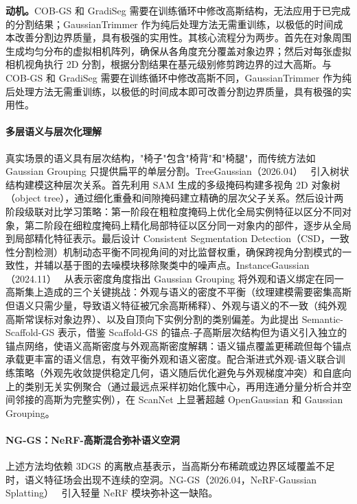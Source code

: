 \textbf{动机。}COB-GS 和 GradiSeg 需要在训练循环中修改高斯结构，无法应用于已完成的分割结果；GaussianTrimmer 作为纯后处理方法无需重训练，以极低的时间成本改善分割边界质量，具有极强的实用性。其核心流程分为两步。首先在对象周围生成均匀分布的虚拟相机阵列，确保从各角度充分覆盖对象边界；然后对每张虚拟相机视角执行 2D 分割，根据分割结果在基元级别修剪跨边界的过大高斯。与 COB-GS 和 GradiSeg 需要在训练循环中修改高斯不同，GaussianTrimmer 作为纯后处理方法无需重训练，以极低的时间成本即可改善分割边界质量，具有极强的实用性。

\paragraph{多层语义与层次化理解} 真实场景的语义具有层次结构，"椅子"包含"椅背"和"椅腿"，而传统方法如 Gaussian Grouping 只提供扁平的单层分割。TreeGaussian（2026.04）~\cite{2604_03309} 引入树状结构建模这种层次关系。首先利用 SAM 生成的多级掩码构建多视角 2D 对象树（object tree），通过细化重叠和间隙掩码建立精确的层次父子关系。然后设计两阶段级联对比学习策略：第一阶段在粗粒度掩码上优化全局实例特征以区分不同对象，第二阶段在细粒度掩码上精化局部特征以区分同一对象内的部件，逐步从全局到局部精化特征表示。最后设计 Consistent Segmentation Detection（CSD，一致性分割检测）机制动态平衡不同视角间的对比监督权重，确保跨视角分割模式的一致性，并辅以基于图的去噪模块移除聚类中的噪声点。InstanceGaussian（2024.11）~\cite{2411_19235} 从表示密度角度指出 Gaussian Grouping 将外观和语义绑定在同一高斯集上造成的三个关键挑战：外观与语义的密度不平衡（纹理建模需要密集高斯但语义只需少量，导致语义特征被冗余高斯稀释）、外观与语义的不一致（纯外观高斯常误标对象边界）、以及自顶向下实例分割的类别偏差。为此提出 Semantic-Scaffold-GS 表示，借鉴 Scaffold-GS 的锚点-子高斯层次结构但为语义引入独立的锚点网络，使语义高斯密度与外观高斯密度解耦：语义锚点覆盖更稀疏但每个锚点承载更丰富的语义信息，有效平衡外观和语义密度。配合渐进式外观-语义联合训练策略（外观先收敛提供稳定几何，语义随后优化避免与外观梯度冲突）和自底向上的类别无关实例聚合（通过最远点采样初始化簇中心，再用连通分量分析合并空间邻接的高斯为完整实例），在 ScanNet 上显著超越 OpenGaussian 和 Gaussian Grouping。

\paragraph{NG-GS：NeRF-高斯混合弥补语义空洞} 上述方法均依赖 3DGS 的离散点基表示，当高斯分布稀疏或边界区域覆盖不足时，语义特征场会出现不连续的空洞。NG-GS（2026.04，NeRF-Gaussian Splatting）~\cite{2604_14706} 引入轻量 NeRF 模块弥补这一缺陷。

